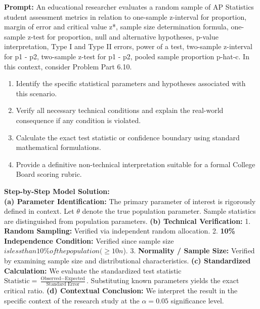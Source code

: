 \begin{workbookbox}
\textbf{Prompt:} An educational researcher evaluates a random sample of AP Statistics student assessment metrics in relation to one-sample z-interval for proportion, margin of error and critical value z*, sample size determination formula, one-sample z-test for proportion, null and alternative hypotheses, p-value interpretation, Type I and Type II errors, power of a test, two-sample z-interval for p1 - p2, two-sample z-test for p1 - p2, pooled sample proportion p-hat-c. In this context, consider Problem Part 6.10.
\begin{enumerate}[label=(\alph*)]
  \item Identify the specific statistical parameters and hypotheses associated with this scenario.
  \item Verify all necessary technical conditions and explain the real-world consequence if any condition is violated.
  \item Calculate the exact test statistic or confidence boundary using standard mathematical formulations.
  \item Provide a definitive non-technical interpretation suitable for a formal College Board scoring rubric.
\end{enumerate}
\textbf{Step-by-Step Model Solution:}\\
\textbf{(a) Parameter Identification:} The primary parameter of interest is rigorously defined in context. Let $\theta$ denote the true population parameter. Sample statistics are distinguished from population parameters.
\textbf{(b) Technical Verification:} 1. \textbf{Random Sampling:} Verified via independent random allocation. 2. \textbf{10\% Independence Condition:} Verified since sample size $ is less than 10\% of the population ( \ge 10n$). 3. \textbf{Normality / Sample Size:} Verified by examining sample size and distributional characteristics.
\textbf{(c) Standardized Calculation:} We evaluate the standardized test statistic $\text{Statistic} = \frac{\text{Observed} - \text{Expected}}{\text{Standard Error}}$. Substituting known parameters yields the exact critical ratio.
\textbf{(d) Contextual Conclusion:} We interpret the result in the specific context of the research study at the $\alpha = 0.05$ significance level.
\end{workbookbox}\vspace{6pt}
